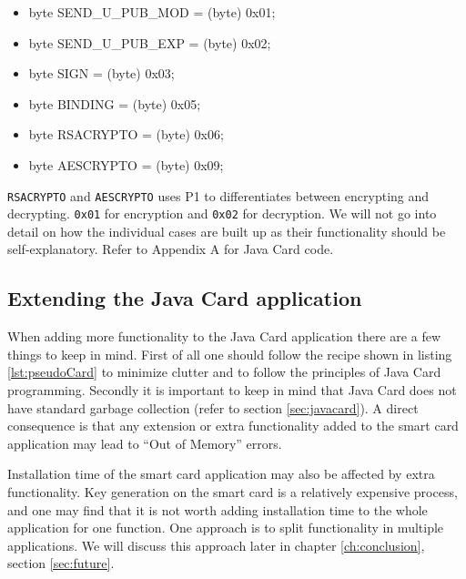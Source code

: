 \begin{itemize}
    \item byte SEND\_U\_PUB\_MOD = (byte) 0x01;
    \item byte SEND\_U\_PUB\_EXP = (byte) 0x02;
    \item byte SIGN = (byte) 0x03;
    \item byte BINDING = (byte) 0x05;
    \item byte RSACRYPTO = (byte) 0x06;
    \item byte AESCRYPTO = (byte) 0x09;
\end{itemize}

\texttt{RSACRYPTO} and \texttt{AESCRYPTO} uses P1 to differentiates between encrypting and decrypting. \texttt{0x01} for encryption and \texttt{0x02} for decryption.
We will not go into detail on how the individual cases are built up as their functionality should be self-explanatory. Refer to Appendix A for Java Card code.

\subsection{Extending the Java Card application}
When adding more functionality to the Java Card application there are a few things to keep in mind. First of all one should follow the recipe shown in listing \ref{lst:pseudoCard} to minimize clutter and to follow the principles of Java Card programming. Secondly it is important to keep in mind that Java Card does not have standard garbage collection (refer to section \ref{sec:javacard}). A direct consequence is that any extension or extra functionality added to the smart card application may lead to ``Out of Memory'' errors.

Installation time of the smart card application may also be affected by extra functionality. Key generation on the smart card is a relatively expensive process, and one may find that it is not worth adding installation time to the whole application for one function. One approach is to split functionality in multiple applications. We will discuss this approach later in chapter \ref{ch:conclusion}, section \ref{sec:future}.
